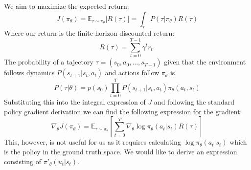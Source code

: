 \documentclass{article}
\begin{document}
We aim to maximize the expected return:
\begin{equation}
J(\pi_\theta) = \mathbb{E}_{\tau \sim \pi_\theta} \big[ R(\tau) \big]=\int_{\tau} P(\tau|\pi_\theta) R(\tau)
\end{equation}
Where our return is the finite-horizon discounted return:
\begin{equation}
R(\tau) = \sum_{t=0}^{T-1} \gamma^{t} r_{t}.
\end{equation}
The probability of a tajectory $\tau  = (s_0,a_0,\dots,s_{T+1})$ given that the environment follows dynamics $P(s_{t+1}|s_t,a_t)$ and actions follow $\pi_\theta$  is
\begin{equation}
P(\tau|\theta) = p(s_0)\prod_{t=0}^TP(s_{t+1}|s_t,a_t)\pi_\theta(a_t,s_t)
\end{equation}
Substituting this into the integral expression of $J$ and following the standard policy gradient derivation we can find the following expression for the gradient:
\begin{equation}
\nabla_\theta J(\pi_\theta) = \mathbb{E}_{\tau \sim\pi_\theta}[\sum_{t=0}^T\nabla_\theta \log \pi_\theta(a_t|s_t) R(\tau)]
\end{equation}
This, however, is not useful for us as it requires calculating $\log\pi_\theta(a_t|s_t)$ which is the policy in the ground truth space. We would like to derive an expression consisting of $\pi'_{\theta}(u_t|s_t)$.
\end{document}

